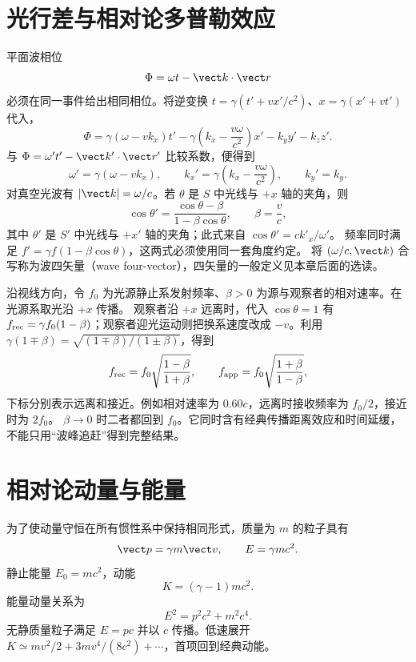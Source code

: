 \section{光行差与相对论多普勒效应}

平面波相位
\begin{equation}
 \Phi=\omega t-\vect k\cdot\vect r
\end{equation}
必须在同一事件给出相同相位。将逆变换 $t=\gamma(t'+vx'/c^2)$、$x=\gamma(x'+vt')$ 代入，
\[
 \Phi=\gamma(\omega-vk_x)t'
 -\gamma\left(k_x-\frac{v\omega}{c^2}\right)x'-k_yy'-k_zz'.
\]
与 $\Phi=\omega't'-\vect k'\cdot\vect r'$ 比较系数，便得到
\begin{equation}
 \omega'=\gamma(\omega-vk_x),\qquad
 k_x'=\gamma\left(k_x-\frac{v\omega}{c^2}\right),\qquad
 k_y'=k_y.
\end{equation}
对真空光波有 $|\vect k|=\omega/c$。若 $\theta$ 是 $S$ 中光线与 $+x$ 轴的夹角，则
\begin{equation}
 \cos\theta'=\frac{\cos\theta-\beta}{1-\beta\cos\theta},\qquad
 \beta=\frac vc,
\end{equation}
其中 $\theta'$ 是 $S'$ 中光线与 $+x'$ 轴的夹角；此式来自 $\cos\theta'=ck'_x/\omega'$。
频率同时满足 $f'=\gamma f(1-\beta\cos\theta)$，这两式必须使用同一套角度约定。
将 $(\omega/c,\vect k)$ 合写称为波四矢量（wave four-vector），四矢量的一般定义见本章后面的选读。

沿视线方向，令 $f_0$ 为光源静止系发射频率、$\beta>0$ 为源与观察者的相对速率。在光源系取光沿 $+x$ 传播。
观察者沿 $+x$ 远离时，代入 $\cos\theta=1$ 有
$f_{\rm rec}=\gamma f_0(1-\beta)$；观察者迎光运动则把换系速度改成 $-v$。利用
$\gamma(1\mp\beta)=\sqrt{(1\mp\beta)/(1\pm\beta)}$，得到
\begin{equation}
 f_{\rm rec}=f_0\sqrt{\frac{1-\beta}{1+\beta}},
 \qquad
 f_{\rm app}=f_0\sqrt{\frac{1+\beta}{1-\beta}},
\end{equation}
下标分别表示远离和接近。例如相对速率为 $0.60c$，远离时接收频率为 $f_0/2$，接近时为 $2f_0$。
$\beta\to0$ 时二者都回到 $f_0$。它同时含有经典传播距离效应和时间延缓，不能只用“波峰追赶”得到完整结果。





\section{相对论动量与能量}

为了使动量守恒在所有惯性系中保持相同形式，质量为 $m$ 的粒子具有
\begin{equation}
 \vect p=\gamma m\vect v,
 \qquad E=\gamma mc^2.
\end{equation}
静止能量 $E_0=mc^2$，动能
\begin{equation}
 K=(\gamma-1)mc^2.
\end{equation}
能量动量关系为
\begin{equation}
 E^2=p^2c^2+m^2c^4.
\end{equation}
无静质量粒子满足 $E=pc$ 并以 $c$ 传播。低速展开
$K\simeq mv^2/2+3mv^4/(8c^2)+\cdots$，首项回到经典动能。


